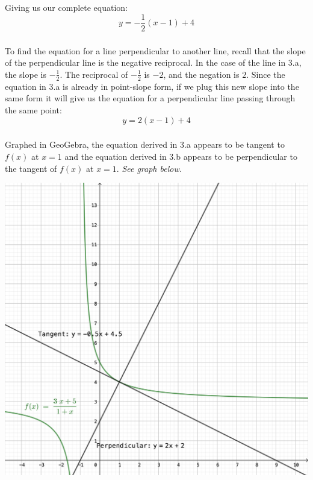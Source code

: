 \documentclass{article}
\begin{document}
\quad
\Longunderstack[l]{
  \phantom{ }
}
\\
\\

Giving us our complete equation:
$$
\boxed{y = -\frac{1}{2}(x-1)+4}
$$

\subsubsection{}
To find the equation for a line perpendicular to another line, recall that the slope of the perpendicular line is the negative reciprocal. In the case of the line in 3.a, the slope is $-\frac{1}{2}$. The reciprocal of $-\frac{1}{2}$ is $-2$, and the negation is $2$. Since the equation in
3.a is already in point-slope form, if we plug this new slope into the same form it will give us the equation for a perpendicular line passing through the same point:
$$
\boxed{y=2(x-1)+4}
$$

\subsubsection{}
Graphed in GeoGebra, the equation derived in 3.a appears to be tangent
to $f(x)$ at $x=1$ and the equation derived in 3.b appears to be perpendicular
to the tangent of $f(x)$ at $x=1$. \emph{See graph below.}

\includegraphics[width=\textwidth]{gp2-3}
\end{document}
